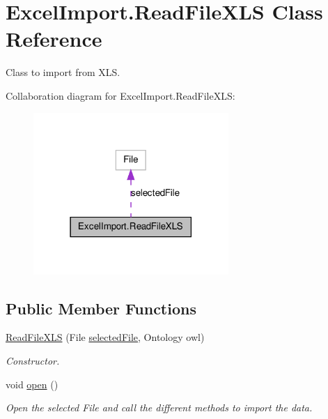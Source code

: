 \hypertarget{class_excel_import_1_1_read_file_x_l_s}{
\section{ExcelImport.ReadFileXLS Class Reference}
\label{class_excel_import_1_1_read_file_x_l_s}
}


Class to import from XLS.  




Collaboration diagram for ExcelImport.ReadFileXLS:
\nopagebreak
\begin{figure}[H]
\begin{center}
\leavevmode
\includegraphics[width=210pt]{class_excel_import_1_1_read_file_x_l_s__coll__graph}
\end{center}
\end{figure}
\subsection*{Public Member Functions}
\begin{DoxyCompactItemize}
\item 
\hyperlink{class_excel_import_1_1_read_file_x_l_s_a773b090a6a2f734afe8dfb577ba121c8}{ReadFileXLS} (File \hyperlink{class_excel_import_1_1_read_file_x_l_s_a1828e678ccd6df307ff90249fc59a86c}{selectedFile}, Ontology owl)
\begin{DoxyCompactList}\small\item\em Constructor. \end{DoxyCompactList}\item 
\hypertarget{class_excel_import_1_1_read_file_x_l_s_a07c3d6f18005bbf02625abce841a9b8f}{
void \hyperlink{class_excel_import_1_1_read_file_x_l_s_a07c3d6f18005bbf02625abce841a9b8f}{open} ()}
\label{class_excel_import_1_1_read_file_x_l_s_a07c3d6f18005bbf02625abce841a9b8f}

\begin{DoxyCompactList}\small\item\em Open the selected File and call the different methods to import the data. \end{DoxyCompactList}\end{DoxyCompactItemize}
